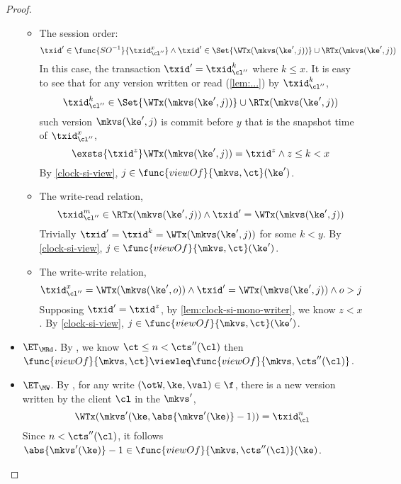 \begin{proof}
\begin{itemize}
            \begin{itemize}
                \item The session order:
                    \[
                    \txid' \in \func{SO^{-1}}{\txid_{\cl''}^x}
                    \land \txid' \in \Set{\WTx(\mkvs(\ke',j))} \cup  \RTx(\mkvs(\ke',j))
                    \]
                    In this case, the transaction \( \txid' = \txid_{\cl''}^k \) where \( k \leq x \).
                    It is easy to see that for any version written or read (\cref{lem:...}) by \( \txid_{\cl''}^k \), \ie
                    \[     
                        \txid_{\cl''}^k \in \Set{\WTx(\mkvs(\ke',j))} \cup  \RTx(\mkvs(\ke',j))
                    \]
                    such version  \( \mkvs(\ke',j) \) is commit before \( y \) that is the snapshot time  of \(  \txid_{\cl''}^x \),
                    \[     
                        \exsts{\txid^z} \WTx(\mkvs(\ke',j)) = \txid^z \land z \leq k < x
                    \]
                    By \cref{clock-si-view}, \( j \in \func{viewOf}{\mkvs,\ct}(\ke') \).
                \item The write-read relation,
                    \[
                        \txid_{\cl''}^m \in \RTx(\mkvs(\ke',j)) 
                        \land \txid' = \WTx(\mkvs(\ke',j))
                    \]
                    Trivially \( \txid' = \txid^k = \WTx(\mkvs(\ke',j)) \) for some \( k < y \).
                    By \cref{clock-si-view}, \( j \in \func{viewOf}{\mkvs,\ct}(\ke') \).
                \item The write-write relation,
                    \[
                        \txid_{\cl''}^{x} = \WTx(\mkvs(\ke',o)) 
                        \land \txid' = \WTx(\mkvs(\ke',j)) \land o > j
                    \]
                    Supposing \( \txid' = \txid^z \), by \cref{lem:clock-si-mono-writer}, we know \( z < x \).
                    By \cref{clock-si-view}, \( j \in \func{viewOf}{\mkvs,\ct}(\ke') \).
            \end{itemize}
        \item \( \ET_\MRd \).
            By , we know \( \ct \leq n < \cts''(\cl) \) then \( \func{viewOf}{\mkvs,\ct} \viewleq \func{viewOf}{\mkvs,\cts''(\cl)} \).
        \item \( \ET_\MW \).
            By , for any write \( (\otW, \ke, \val) \in \f \), there is a new version written by the client \( \cl \) in the \( \mkvs'  \),
            \[
                \WTx(\mkvs'(\ke,\abs{\mkvs'(\ke)} - 1)) = \txid_\cl^{n}
            \]
            Since \( n < \cts''(\cl)\), it follows \( \abs{\mkvs'(\ke)} - 1 \in \func{viewOf}{\mkvs,\cts''(\cl)}(\ke) \).

\end{itemize}
\end{proof}
